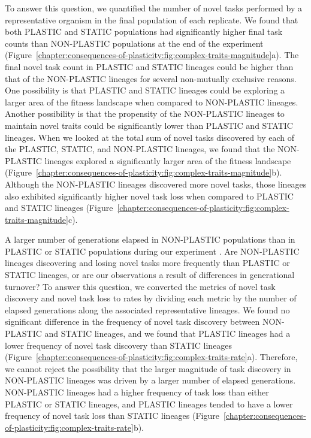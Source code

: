 To answer this question, we quantified the number of novel tasks performed by a representative organism in the final population of each replicate.
We found that both PLASTIC and STATIC populations had significantly higher final task counts than NON-PLASTIC populations at the end of the experiment (Figure~\ref{chapter:consequences-of-plasticity:fig:complex-traits-magnitude}a). 
The final novel task count in PLASTIC and STATIC lineages could be higher than that of the NON-PLASTIC lineages for several non-mutually exclusive reasons. 
One possibility is that PLASTIC and STATIC lineages could be exploring a larger area of the fitness landscape when compared to NON-PLASTIC lineages. 
Another possibility is that the propensity of the NON-PLASTIC lineages to maintain novel traits could be significantly lower than PLASTIC and STATIC lineages. 
When we looked at the total sum of novel tasks discovered by each of the PLASTIC, STATIC, and NON-PLASTIC lineages, we found that the NON-PLASTIC lineages explored a significantly larger area of the fitness landscape (Figure~\ref{chapter:consequences-of-plasticity:fig:complex-traits-magnitude}b).
Although the NON-PLASTIC lineages discovered more novel tasks, those lineages also exhibited significantly higher novel task loss when compared to PLASTIC and STATIC lineages (Figure~\ref{chapter:consequences-of-plasticity:fig:complex-traits-magnitude}c). 



A larger number of generations elapsed in NON-PLASTIC populations than in PLASTIC or STATIC populations during our experiment \citep{consequences_of_plasticity_supplemental_material_2021}.
Are NON-PLASTIC lineages discovering and losing novel tasks more frequently than PLASTIC or STATIC lineages, or are our observations a result of differences in generational turnover?
To answer this question, we converted the metrics of novel task discovery and novel task loss to rates by dividing each metric by the number of elapsed generations along the associated representative lineages.
We found no significant difference in the frequency of novel task discovery between NON-PLASTIC and STATIC lineages, and we found that PLASTIC lineages had a lower frequency of novel task discovery than STATIC lineages (Figure~\ref{chapter:consequences-of-plasticity:fig:complex-traits-rate}a).
Therefore, we cannot reject the possibility that the larger magnitude of task discovery in NON-PLASTIC lineages was driven by a larger number of elapsed generations.
NON-PLASTIC lineages had a higher frequency of task loss than either PLASTIC or STATIC lineages, and PLASTIC lineages tended to have a lower frequency of novel task loss than STATIC lineages (Figure~\ref{chapter:consequences-of-plasticity:fig:complex-traits-rate}b). 

